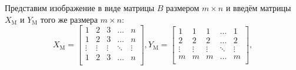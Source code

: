 \documentclass[12pt,a4paper]{article}
\begin{document}
Представим изображение в виде матрицы $B$ размером $m \times n$ и введём матрицы $X_{\text{M}}$ и $Y_{\text{M}}$ того же размера $m \times n$:
\begin{equation}\label{eq:eq16}
X_{\text{M}}=
\begin{bmatrix}
1 & 2 & 3 & \dots  & n \\
1 & 2 & 3 & \dots  & n \\
\vdots & \vdots & \vdots & \ddots & \vdots \\
1 & 2 & 3 & \dots  & n \\
\end{bmatrix}, 
Y_{\text{M}}=
\begin{bmatrix}
1 & 1 & 1 & \dots  & 1 \\
2 & 2 & 2 & \dots  & 2 \\
\vdots & \vdots & \vdots & \ddots & \vdots \\
m & m & m & \dots  & m \\
\end{bmatrix},
\end{equation}
\end{document}
